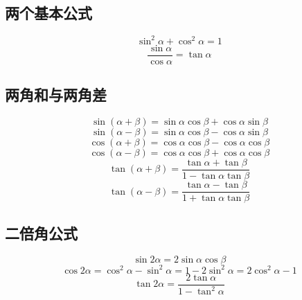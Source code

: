 
\begin{issues}
\issueDraft
{}
\end{issues}

\subsection{两个基本公式}
\begin{equation}
\sin^2\alpha + \cos^2\alpha = 1
\end{equation}
\begin{equation}
\frac{\sin\alpha}{\cos\alpha} = \tan\alpha
\end{equation}

\subsection{两角和与两角差}
\begin{equation}
\sin(\alpha + \beta) = \sin\alpha \cos\beta + \cos\alpha \sin\beta
\end{equation}
\begin{equation}
\sin(\alpha - \beta) = \sin\alpha \cos\beta - \cos\alpha \sin\beta
\end{equation}
\begin{equation}
\cos(\alpha + \beta) = \cos\alpha \cos\beta - \cos\alpha \cos\beta
\end{equation}
\begin{equation}
\cos(\alpha - \beta) = \cos\alpha \cos\beta + \cos\alpha \cos\beta
\end{equation}
\begin{equation}
\tan(\alpha + \beta) = \frac{\tan\alpha+\tan\beta}{1-\tan\alpha \tan\beta}
\end{equation}
\begin{equation}
\tan(\alpha - \beta) = \frac{\tan\alpha - \tan\beta}{1+\tan\alpha \tan\beta}
\end{equation}

\subsection{二倍角公式}
\begin{equation}
\sin2\alpha = 2\sin\alpha \cos\beta
\end{equation}
\begin{equation}
\cos2\alpha = \cos^2\alpha - \sin^2\alpha = 1 - 2\sin^2\alpha = 2\cos^2\alpha -1
\end{equation}
\begin{equation}
\tan2\alpha = \frac{2\tan\alpha}{1-\tan^2\alpha}
\end{equation}

